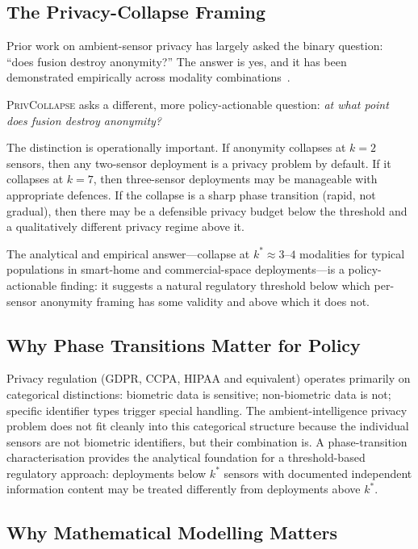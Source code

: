 \documentclass[sigconf,nonacm]{acmart}
\begin{document}
\subsection{The Privacy-Collapse Framing}

Prior work on ambient-sensor privacy has largely asked the binary
question: ``does fusion destroy anonymity?'' The answer is yes, and
it has been demonstrated empirically across modality
combinations~\cite{lu2019mid,rizk2025identifi,george2025tinyml}.

\textsc{PrivCollapse} asks a different, more policy-actionable
question: \emph{at what point does fusion destroy anonymity?}

The distinction is operationally important. If anonymity collapses
at $k = 2$ sensors, then any two-sensor deployment is a privacy
problem by default. If it collapses at $k = 7$, then three-sensor
deployments may be manageable with appropriate defences. If the
collapse is a sharp phase transition (rapid, not gradual), then
there may be a defensible privacy budget below the threshold and
a qualitatively different privacy regime above it.

The analytical and empirical answer---collapse at $k^* \approx
3$--$4$ modalities for typical populations in smart-home and
commercial-space deployments---is a policy-actionable finding:
it suggests a natural regulatory threshold below which per-sensor
anonymity framing has some validity and above which it does not.

\subsection{Why Phase Transitions Matter for Policy}

Privacy regulation (GDPR, CCPA, HIPAA and equivalent) operates
primarily on categorical distinctions: biometric data is sensitive;
non-biometric data is not; specific identifier types trigger
special handling. The ambient-intelligence privacy problem does
not fit cleanly into this categorical structure because the
individual sensors are not biometric identifiers, but their
combination is. A phase-transition characterisation provides the
analytical foundation for a threshold-based regulatory approach:
deployments below $k^*$ sensors with documented independent
information content may be treated differently from deployments
above $k^*$.

\subsection{Why Mathematical Modelling Matters}
\end{document}
